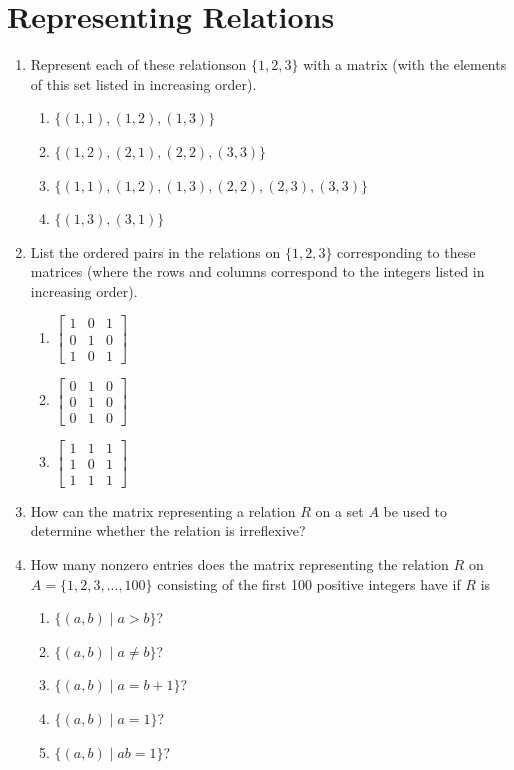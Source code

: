 \documentclass{../../cls/sig-alternate-05-2015}
\begin{document}
\section{Representing Relations}
\begin{enumerate}
\item Represent each of these relationson $\{1, 2, 3\}$ with a matrix (with the elements of this set listed in increasing order).
\begin{enumerate}
	\item $\{(1, 1), (1, 2), (1, 3)\}$ 
	\item $\{(1, 2), (2, 1), (2, 2), (3, 3)\}$
	\item $\{(1, 1), (1, 2), (1, 3), (2, 2), (2, 3), (3, 3)\}$ 
	\item $\{(1, 3), (3, 1)\}$
\end{enumerate}

\item List the ordered pairs in the relations on $\{1, 2, 3\}$ corresponding to these matrices (where the rows and columns
correspond to the integers listed in increasing order).
\begin{enumerate}
	\item $\begin{bmatrix}
		1 & 0 & 1\\
		0 & 1 & 0\\
		1 & 0 & 1
	\end{bmatrix}$
	
	\item $\begin{bmatrix}
		0 & 1 & 0\\
		0 & 1 & 0\\
		0 & 1 & 0
	\end{bmatrix}$
	\item $\begin{bmatrix}
		1 & 1 & 1\\
		1 & 0 & 1\\
		1 & 1 & 1
	\end{bmatrix}$
\end{enumerate}

\item How can the matrix representing a relation $R$ on a set $A$
be used to determine whether the relation is irreflexive?

\item How many nonzero entries does the matrix representing
the relation $R$ on $A = \{1, 2, 3, ..., 100\}$ consisting of the
first 100 positive integers have if $R$ is \begin{enumerate}
	\item $\{(a, b) \mid a > b\}$?
	\item $\{(a, b) \mid a \ne b\}$?
	\item $\{(a, b) \mid a = b + 1\}$?
	\item $\{(a, b) \mid a = 1\}$?
	\item $\{(a, b) \mid ab = 1\}$?
\end{enumerate}


\end{enumerate}
\end{document}
